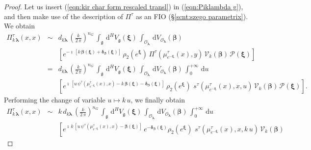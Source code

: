 \documentclass[12pt,a4paper]{article}
\theoremstyle{plain}
\theoremstyle{definition}
\begin{document}
\begin{proof}
Let us insert (\ref{eqn:kir char form rescaled transl})
in (\ref{eqn:Piklambda g}), and then make use of the description of 
$\Pi^\tau$ as an FIO (\S \ref{scnt:szego parametrix}).
We obtain
%
\begin{eqnarray}
\label{eqn:Piklambda g expanded}
\Pi^\tau_{k\,\boldsymbol{\lambda}}(x,x)&\sim&
d_{k\boldsymbol{\lambda}}\,\left(\frac{k}{2\,\pi}\right)^{n_G}\,
\int_{\mathfrak{g}}\,
\mathrm{d}^HV_{\mathfrak{g}}(\boldsymbol{\xi})\,\int_{\mathcal{O}_{\boldsymbol{\lambda}}}\,
\mathrm{d}
V_{\mathcal{O}_{\boldsymbol{\lambda}}}(\boldsymbol{\beta})\\
&&\left[
 e^{-\imath\,[k\,\boldsymbol{\beta}(\boldsymbol{\xi})+
\boldsymbol{\delta}_{\boldsymbol{\beta}}(\boldsymbol{\xi})]
}\,
\rho_2(e^{\boldsymbol{\xi}})\,
\Pi^\tau
\left(\mu^\tau_{e^{-\boldsymbol{\xi}}}(x),y   \right)\,\mathcal{V}_k(\boldsymbol{\beta})\,
\mathcal{P}(\boldsymbol{\xi})\right]\nonumber\\
&=&d_{k\boldsymbol{\lambda}}\,\left(\frac{k}{2\,\pi}\right)^{n_G}\,
\int_{\mathfrak{g}}\,
\mathrm{d}^HV_{\mathfrak{g}}(\boldsymbol{\xi})\,\int_{\mathcal{O}_{\boldsymbol{\lambda}}}\,
\mathrm{d}
V_{\mathcal{O}_{\boldsymbol{\lambda}}}(\boldsymbol{\beta})
\,\int_0^{+\infty}\,\mathrm{d}u
\nonumber\\
&&\left[
 e^{\imath\,\left[u\,\psi^\tau\left(\mu^\tau_{e^{-\boldsymbol{\xi}}}(x),x   \right)-k\,\boldsymbol{\beta}(\boldsymbol{\xi})-
\boldsymbol{\delta}_{\boldsymbol{\beta}}(\boldsymbol{\xi})\right]
}\,
\rho_2(e^{\boldsymbol{\xi}})\,\,
s^\tau\left(\mu^\tau_{e^{-\boldsymbol{\xi}}}(x),x  ,u\right)\,\mathcal{V}_k(\boldsymbol{\beta})\,
\mathcal{P}(\boldsymbol{\xi})\right].\nonumber
\end{eqnarray}
%
Performing the change of variable $u\mapsto k\,u$, we finally obtain
%
\begin{eqnarray}
\label{eqn:Piklambda g expanded resc}
\Pi^\tau_{k\,\boldsymbol{\lambda}}(x,x)&\sim&
k\,d_{k\boldsymbol{\lambda}}\,\left(\frac{k}{2\,\pi}\right)^{n_G}\,
\int_{\mathfrak{g}}\,
\mathrm{d}^HV_{\mathfrak{g}}(\boldsymbol{\xi})\,\int_{\mathcal{O}_{\boldsymbol{\lambda}}}\,
\mathrm{d}
V_{\mathcal{O}_{\boldsymbol{\lambda}}}(\boldsymbol{\beta})
\,\int_0^{+\infty}\,\mathrm{d}u
\\
&&\left[
 e^{\imath\,k\,\left[u\,\psi^\tau\left(\mu^\tau_{e^{-\boldsymbol{\xi}}}(x),x   \right)-\boldsymbol{\beta}(\boldsymbol{\xi})\right]
}\,e^{-
\boldsymbol{\delta}_{\boldsymbol{\beta}}(\boldsymbol{\xi})}
\rho_2(e^{\boldsymbol{\xi}})\,\,
s^\tau\left(\mu^\tau_{e^{-\boldsymbol{\xi}}}(x),x  ,k\,u\right)\,\mathcal{V}_k(\boldsymbol{\beta})\,

\end{eqnarray}
\end{proof}
\end{document}
